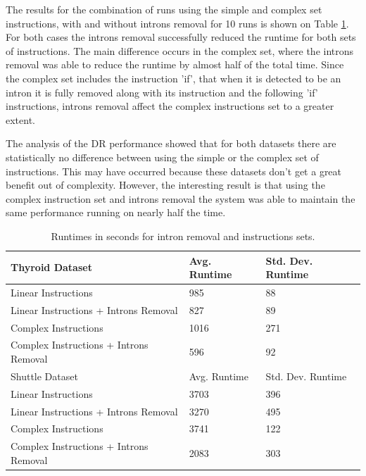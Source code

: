 \documentclass[journal]{IEEEtran}
\begin{document}
The results for the combination of runs using the simple and complex set instructions, with and without introns removal for 10 runs is shown on Table \ref{table:runtime}. For both cases the introns removal successfully reduced the runtime for both sets of instructions. The main difference occurs in the complex set, where the introns removal was able to reduce the runtime by almost half of the total time. Since the complex set includes the instruction 'if', that when it is detected to be an intron it is fully removed along with its instruction and the following 'if' instructions, introns removal affect the complex instructions set to a greater extent.

The analysis of the DR performance showed that for both datasets there are statistically no difference between using the simple or the complex set of instructions. This may have occurred because these datasets don't get a great benefit out of complexity. However, the interesting result is that using the complex instruction set and introns removal the system was able to maintain the same performance running on nearly half the time.

\begin{table}[h]
\centering
\captionsetup{justification=centering}
\begin{tabular}{@{}lll@{}}
\toprule
Thyroid Dataset &  Avg. Runtime &  Std. Dev. Runtime\\
\midrule
Linear Instructions    & 985  & 88 \\
Linear Instructions + Introns Removal   & 827  & 89 \\
Complex Instructions    & 1016  & 271 \\
Complex Instructions + Introns Removal   & 596  & 92 \\
\midrule
Shuttle Dataset & Avg. Runtime &  Std. Dev. Runtime \\
\midrule
Linear Instructions    & 3703  & 396 \\
Linear Instructions + Introns Removal   & 3270  & 495 \\
Complex Instructions    & 3741  & 122 \\
Complex Instructions + Introns Removal   & 2083  & 303 \\
\bottomrule
\end{tabular}
\caption{Runtimes in seconds for intron removal and instructions sets.}
\label{table:runtime}
\end{table}
\end{document}
